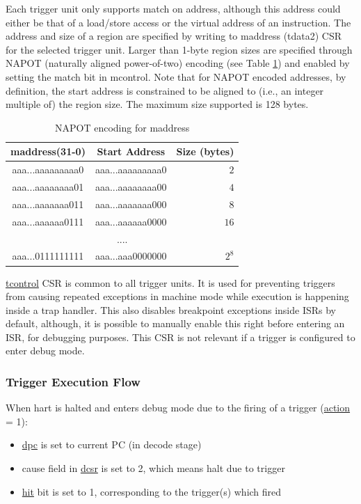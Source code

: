 \documentclass[main\_\_EN.tex]{subfiles}
\begin{document}
Each trigger unit only supports match on address, although this address could either be that of a load/store access or the virtual address of an instruction. The address and size of a region are specified by writing to maddress (tdata2) CSR for the selected trigger unit. Larger than 1-byte region sizes are specified through NAPOT (naturally aligned power-of-two) encoding (see Table \ref{tab:riscvcpu-hwt-table}) and enabled by setting the match bit in mcontrol. Note that for NAPOT encoded addresses, by definition, the start address is constrained to be aligned to (i.e., an integer multiple of) the region size. The maximum size supported is 128 bytes.

\begin{longtable}{ | c | c | r | }
\caption{NAPOT encoding for maddress} \label{tab:riscvcpu-hwt-table}
\\ \hline
\rowcolor{lightgray}
maddress(31-0) & Start Address & Size (bytes) \\ \hline
aaa...aaaaaaaaa0 & aaa...aaaaaaaaa0 & $2$ \\ \hline
aaa...aaaaaaaa01 & aaa...aaaaaaaa00 & $4$ \\ \hline
aaa...aaaaaaa011 & aaa...aaaaaaa000 & $8$ \\ \hline
aaa...aaaaaa0111 & aaa...aaaaaa0000 & $16$ \\ \hline
\multicolumn{3}{c}{....} \\ \hline
aaa...0111111111 & aaa...aaa0000000 & $2^{8}$ \\ \hline
\end{longtable}

\hyperref[regdesc:TCONTROL]{tcontrol} CSR is common to all trigger units. It is used for preventing triggers from causing repeated exceptions in machine mode while execution is happening inside a trap handler. This also disables breakpoint exceptions inside ISRs by default, although, it is possible to manually enable this right before entering an ISR, for debugging purposes. This CSR is not relevant if a trigger is configured to enter debug mode.

\subsubsection{Trigger Execution Flow}
\label{sec:riscvcpu-hwt-suggest-op}

When hart is halted and enters debug mode due to the firing of a trigger (\hyperref[fielddesc:MCONTROLACTION]{action} = 1):
\begin{itemize}
    \item \hyperref[regdesc:DPC]{dpc} is set to current PC (in decode stage)
    \item cause field in \hyperref[regdesc:DCSR]{dcsr} is set to 2, which means halt due to trigger
    \item \hyperref[fielddesc:MCONTROLHIT]{hit} bit is set to 1, corresponding to the trigger(s) which fired
\end{itemize}
\end{document}
